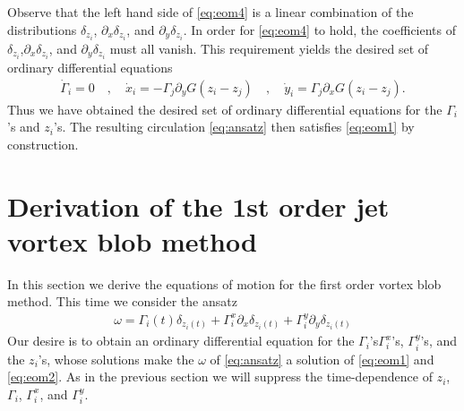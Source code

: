 \documentclass[12pt]{amsart}
\begin{document}
Observe that the left hand side of \eqref{eq:eom4}
is a linear combination of the distributions
$\delta_{z_i}$, $\partial_x\delta_{z_i}$, and $\partial_y \delta_{z_i}$.
In order for \eqref{eq:eom4} to hold, the coefficients of $\delta_{z_i}$,$\partial_x \delta_{z_i}$, and $\partial_y \delta_{z_i}$ must all vanish.
This requirement yields the desired set of ordinary differential equations
\begin{align*}
  \dot{\Gamma}_i = 0 \quad,\quad
  \dot{x}_i = - \Gamma_j \partial_y G(z_i - z_j) \quad,\quad
  \dot{y}_i =  \Gamma_j \partial_x G(z_i - z_j).
\end{align*}
Thus we have obtained the desired set of ordinary differential equations for the $\Gamma_i$'s and $z_i$'s.
The resulting circulation \eqref{eq:ansatz} then satisfies \eqref{eq:eom1} by construction.

\section{Derivation of the 1st order jet vortex blob method}
\label{sec:1-vortex_blob}
In this section we derive the equations of motion for the
first order vortex blob method.
This time we consider the ansatz
\begin{align}
  \omega = \Gamma_i(t) \delta_{z_i(t)} + \Gamma_i^x \partial_x \delta_{z_i(t)}
  + \Gamma_i^y \partial_y \delta_{z_i(t)}
  \label{eq:1-ansatz}
\end{align} 
Our desire is to obtain an ordinary differential equation for the $\Gamma_i$'s$\Gamma_i^x$'s, $\Gamma_i^y$'s, and the $z_i$'s,
whose solutions make the $\omega$ of \eqref{eq:ansatz} a solution of \eqref{eq:eom1} and \eqref{eq:eom2}.
As in the previous section
we will suppress the time-dependence of $z_i$, $\Gamma_i$, $\Gamma^x_i$,
and $\Gamma_i^y$.
\end{document}
